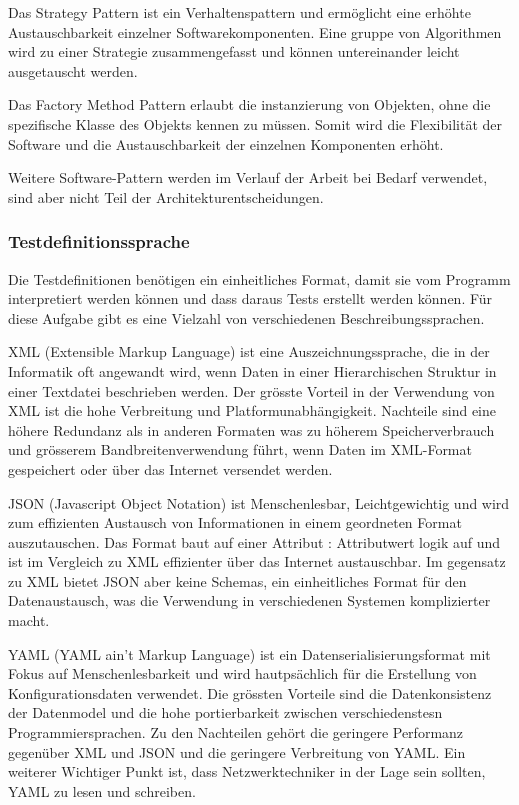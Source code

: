 \documentclass[
	ngerman,
	toc=listof, %
	toc=bibliography, %
	footnotes=multiple, %
	parskip=half, %
	numbers=noendperiod %
]{scrartcl}
\begin{document}
		Das Strategy Pattern ist ein Verhaltenspattern und ermöglicht eine erhöhte Austauschbarkeit einzelner Softwarekomponenten.
		Eine gruppe von Algorithmen wird zu einer Strategie zusammengefasst und können untereinander leicht ausgetauscht werden.
		
		Das Factory Method Pattern erlaubt die instanzierung von Objekten, ohne die spezifische Klasse des Objekts kennen zu müssen.
		Somit wird die Flexibilität der Software und die Austauschbarkeit der einzelnen Komponenten erhöht.
		
		Weitere Software-Pattern werden im Verlauf der Arbeit bei Bedarf verwendet, sind aber nicht Teil der Architekturentscheidungen.
		\newpage

		\subsubsection{Testdefinitionssprache}
		Die Testdefinitionen benötigen ein einheitliches Format, damit sie vom Programm interpretiert werden können und dass daraus Tests erstellt werden können.
		Für diese Aufgabe gibt es eine Vielzahl von verschiedenen Beschreibungssprachen.
		
		XML (Extensible Markup Language) ist eine Auszeichnungssprache, die in der Informatik oft angewandt wird, wenn Daten in einer Hierarchischen Struktur in einer Textdatei beschrieben werden.
		Der grösste Vorteil in der Verwendung von XML ist die hohe Verbreitung und Platformunabhängigkeit.
		Nachteile sind eine höhere Redundanz als in anderen Formaten was zu höherem Speicherverbrauch und grösserem Bandbreitenverwendung führt, wenn Daten im XML-Format gespeichert oder über das Internet versendet werden.

		JSON (Javascript Object Notation) ist Menschenlesbar, Leichtgewichtig und wird zum effizienten Austausch von Informationen in einem geordneten Format auszutauschen.
		Das Format baut auf einer Attribut : Attributwert logik auf und ist im Vergleich zu XML effizienter über das Internet austauschbar.
		Im gegensatz zu XML bietet JSON aber keine Schemas, ein einheitliches Format für den Datenaustausch, was die Verwendung in verschiedenen Systemen komplizierter macht.

		YAML (YAML ain't Markup Language) ist ein Datenserialisierungsformat mit Fokus auf Menschenlesbarkeit und wird hautpsächlich für die Erstellung von Konfigurationsdaten verwendet.
		Die grössten Vorteile sind die Datenkonsistenz der Datenmodel und die hohe portierbarkeit zwischen verschiedenstesn Programmiersprachen.
		Zu den Nachteilen gehört die geringere Performanz gegenüber XML und JSON und die geringere Verbreitung von YAML.
		Ein weiterer Wichtiger Punkt ist, dass Netzwerktechniker in der Lage sein sollten, YAML zu lesen und schreiben.
\end{document}
